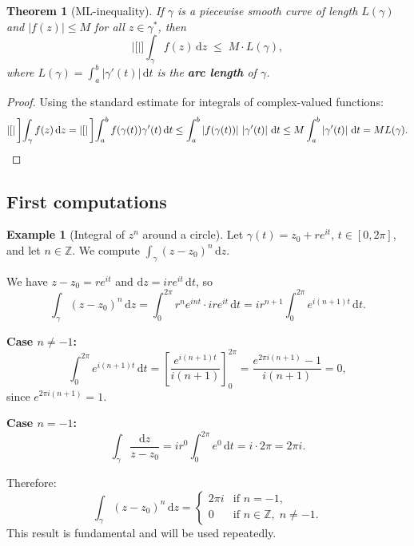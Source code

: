 \documentclass[12pt,a4paper,openany]{book}
\theoremstyle{definition}
\newtheorem{example}[definition]{Example}
\theoremstyle{plain}
\newtheorem{theorem}[definition]{Theorem}
\theoremstyle{remark}
\newcommand{\Z}{\mathbb{Z}}
\newcommand{\dd}{\mathrm{d}}
\newcommand{\abs}[1]{\left|#1\right|}
\begin{document}
\begin{theorem}[ML-inequality]\label{thm:ML-inequality}
If $\gamma$ is a piecewise smooth curve of length $L(\gamma)$ and
$\abs{f(z)}\le M$ for all $z\in\gamma^*$, then
\[
  \abs[\bigg]{\int_\gamma f(z)\,\dd z} \;\le\; M\cdot L(\gamma),
\]
where $L(\gamma) = \int_a^b \abs{\gamma'(t)}\,\dd t$ is the
\textbf{arc length} of $\gamma$.
\end{theorem}

\begin{proof}
Using the standard estimate for integrals of complex-valued functions:
\[
  \abs[\bigg]{\int_\gamma f(z)\,\dd z}
  = \abs[\bigg]{\int_a^b f(\gamma(t))\gamma'(t)\,\dd t}
  \le \int_a^b \abs{f(\gamma(t))}\,\abs{\gamma'(t)}\,\dd t
  \le M\int_a^b\abs{\gamma'(t)}\,\dd t
  = ML(\gamma). \qedhere
\]
\end{proof}

\subsection{First computations}

\begin{example}[Integral of $z^n$ around a circle]\label{ex:integral-zn-circle}
Let $\gamma(t) = z_0+re^{it}$, $t\in[0,2\pi]$, and let $n\in\Z$.
We compute $\int_\gamma (z-z_0)^n\,\dd z$.

We have $z - z_0 = re^{it}$ and $\dd z = ire^{it}\,\dd t$, so
\[
  \int_\gamma (z-z_0)^n\,\dd z
  = \int_0^{2\pi}r^n e^{int}\cdot ire^{it}\,\dd t
  = ir^{n+1}\int_0^{2\pi}e^{i(n+1)t}\,\dd t.
\]

\textbf{Case $n\ne -1$:}
\[
  \int_0^{2\pi}e^{i(n+1)t}\,\dd t
  = \left[\frac{e^{i(n+1)t}}{i(n+1)}\right]_0^{2\pi}
  = \frac{e^{2\pi i(n+1)}-1}{i(n+1)} = 0,
\]
since $e^{2\pi i(n+1)}=1$.

\textbf{Case $n=-1$:}
\[
  \int_\gamma\frac{\dd z}{z-z_0}
  = ir^0\int_0^{2\pi}e^{0}\,\dd t = i\cdot 2\pi = 2\pi i.
\]

Therefore:
\begin{equation}\label{eq:integral-zn-circle}
  \boxed{\int_\gamma(z-z_0)^n\,\dd z
  = \begin{cases} 2\pi i & \text{if } n=-1, \\ 0 & \text{if } n\in\Z,\;n\ne -1. \end{cases}}
\end{equation}
This result is fundamental and will be used repeatedly.
\end{example}
\end{document}
